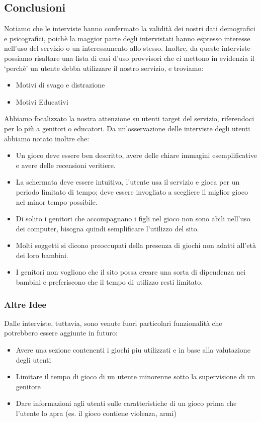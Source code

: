 \documentclass[../Report.tex]{subfiles}
\begin{document}
    \subsection{Conclusioni}

    Notiamo che le interviste hanno confermato la validità dei nostri dati demografici e psicografici, poichè la maggior parte  degli intervistati hanno espresso interesse nell’uso del servizio o un interessamento allo stesso.
    Inoltre, da queste interviste possiamo risaltare una lista di casi d’uso provvisori che ci mettono in evidenzia il ‘perchè’ un utente debba utilizzare il nostro servizio, e troviamo:
    \begin{itemize}
        \item Motivi di svago e distrazione
        \item Motivi Educativi
    \end{itemize}
    Abbiamo focalizzato la nostra attenzione su utenti target del servizio, riferendoci per lo più a genitori o educatori. 
    Da un’osservazione delle interviste degli utenti abbiamo notato inoltre che:
    \begin{itemize}
        \item Un gioco deve essere ben descritto, avere delle chiare immagini esemplificative e avere delle recensioni veritiere.
        \item La schermata deve essere intuitiva, l’utente usa il servizio e gioca per un periodo limitato di tempo; deve essere invogliato a scegliere il miglior gioco nel minor tempo possibile.
        \item Di solito i genitori che accompagnano i figli nel gioco non sono abili nell’uso dei computer, bisogna quindi semplificare l'utilizzo del sito. 
        \item Molti soggetti si dicono preoccupati della presenza di giochi non adatti all'età dei loro bambini. 
        \item I genitori non vogliono che il sito possa creare una sorta di dipendenza nei bambini e preferiscono che il tempo di utilizzo resti limitato. 
    \end{itemize}
    

    \subsubsection{Altre Idee}
    Dalle interviste, tuttavia, sono venute fuori particolari funzionalità che potrebbero essere aggiunte in futuro:
    \begin{itemize}
        \item Avere una sezione contenenti i giochi piu utilizzati e in base alla valutazione degli utenti
        \item Limitare il tempo di gioco di un utente minorenne sotto la supervisione di un genitore
        \item Dare informazioni agli utenti sulle caratteristiche di un gioco prima che l'utente lo apra (es. il gioco contiene violenza, armi)
        
    \end{itemize}
\end{document}
